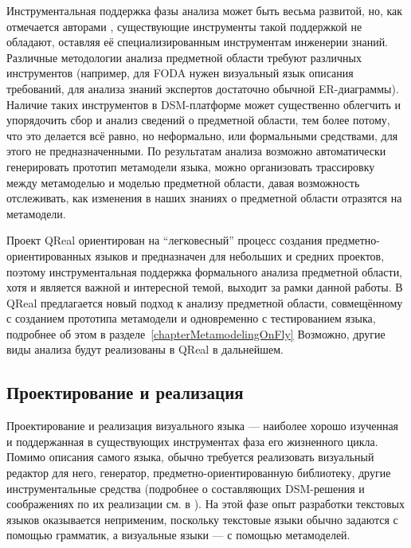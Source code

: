 Инструментальная поддержка фазы анализа может быть весьма развитой, но, как отмечается 
авторами \cite{mernik2005and}, существующие инструменты такой поддержкой не обладают, 
оставляя её специализированным инструментам инженерии знаний. Различные методологии 
анализа предметной области требуют различных инструментов (например, для FODA нужен 
визуальный язык описания требований, для анализа знаний экспертов достаточно обычной 
ER-диаграммы). Наличие таких инструментов в DSM-платформе может существенно облегчить 
и упорядочить сбор и анализ сведений о предметной области, тем более потому, что это 
делается всё равно, но неформально, или формальными средствами, для этого не предназначенными. 
По результатам анализа возможно автоматически генерировать прототип метамодели языка, 
можно организовать трассировку между метамоделью и моделью предметной области, давая 
возможность отслеживать, как изменения в наших знаниях о предметной области отразятся на метамодели.

Проект QReal ориентирован на "`легковесный"' процесс создания предметно-ориентированных 
языков и предназначен для небольших и средних проектов, поэтому инструментальная поддержка 
формального анализа предметной области, хотя и является важной и интересной темой, 
выходит за рамки данной работы. В QReal предлагается новый подход к анализу предметной 
области, совмещённому с созданием прототипа метамодели и одновременно с тестированием языка, 
подробнее об этом в разделе~\ref{chapterMetamodelingOnFly} Возможно, другие виды анализа будут реализованы 
в QReal в дальнейшем.

\subsection{Проектирование и реализация}
Проектирование и реализация визуального языка --- наиболее хорошо изученная и поддержанная 
в существующих инструментах фаза его жизненного цикла. Помимо описания самого языка, 
обычно требуется реализовать визуальный редактор для него, генератор, предметно-ориентированную 
библиотеку, другие инструментальные средства (подробнее о составляющих DSM-решения и 
соображениях по их реализации см. в \cite{kelly2008domain}). На этой фазе опыт разработки 
текстовых языков оказывается неприменим, поскольку текстовые языки обычно задаются с 
помощью грамматик, а визуальные языки --- с помощью метамоделей.

